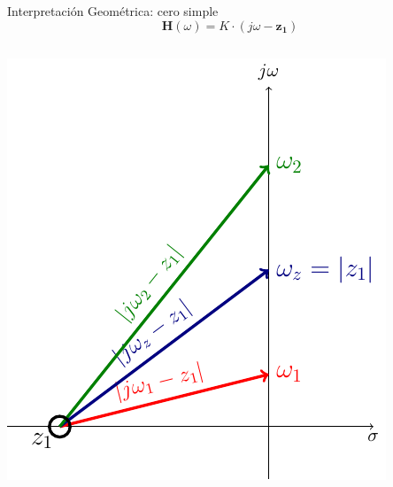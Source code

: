 \documentclass[xcolor={usenames,svgnames,dvipsnames}]{beamer}
\newcommand{\fasor}[1]{\mathbf{#1}(\omega)}
\begin{document}
\begin{frame}[label={sec:org0127f75}]{Interpretación Geométrica: cero simple}
\[
  \fasor{H} = K \cdot (j\omega - \mathbf{z_1})
\]

\begin{columns}
\begin{column}{0.5\columnwidth}
\begin{center}
\includegraphics[width=.9\linewidth]{figs/CeroGeometrica.pdf}
\end{center}
\end{column}


\end{columns}
\end{frame}
\end{document}
